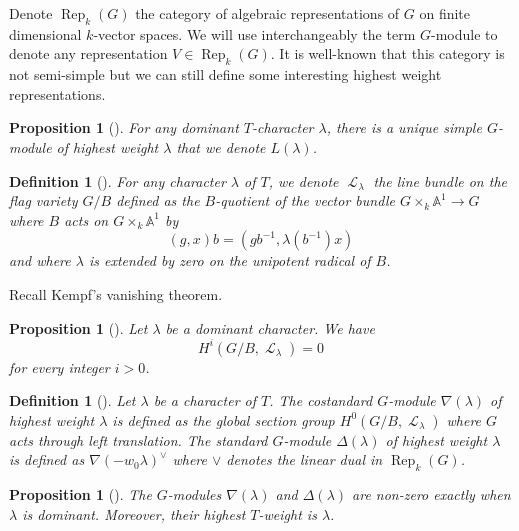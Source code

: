 \documentclass[11pt]{amsart}
\numberwithin{subsection}{section}
\numberwithin{figure}{section}
\numberwithin{table}{section}
\theoremstyle{1}
\newtheorem{proposition}[theorem]{Proposition}
\newtheorem{definition}[theorem]{Definition}
\theoremstyle{2}
\DeclareMathOperator{\Rep}{Rep}
\DeclareMathOperator{\Lc}{\mathcal{L}}
\begin{document}
Denote $\Rep_k(G)$ the category of algebraic representations of $G$ on finite dimensional $k$-vector spaces. We will use interchangeably the term $G$-module to denote any representation $V \in \Rep_k(G)$. It is well-known that this category is not semi-simple but we can still define some interesting highest weight representations. 
\begin{proposition}[{\cite[Part II, sect. 2.4]{MR2015057}}]
For any dominant $T$-character $\lambda$, there is a unique simple $G$-module of highest weight $\lambda$ that we denote $L(\lambda)$. 
\end{proposition}
\begin{definition}[{\cite[Part I, sect. 5.8]{MR2015057}}]
For any character $\lambda$ of $T$, we denote $\Lc_{\lambda}$ the line bundle on the flag variety $G/B$ defined as the $B$-quotient of the vector bundle $G \times_k \mathbb{A}^1 \rightarrow G$ where $B$ acts on $G \times_k \mathbb{A}^1$ by
\begin{equation*}
(g,x)b = (gb^{-1},\lambda(b^{-1})x)
\end{equation*}
and where $\lambda$ is extended by zero on the unipotent radical of $B$.
\end{definition}
\vspace*{0.2cm}
Recall Kempf's vanishing theorem.
\begin{proposition}[{\cite[Part II, sect. 4.5]{MR2015057}}]\label{prop4}
Let $\lambda$ be a dominant character. We have
\begin{equation*}
H^i(G/B,\Lc_{\lambda}) = 0
\end{equation*}
for every integer $i >0$.
\end{proposition}
\vspace*{0.2cm}
\begin{definition}[{\cite[Part II, sect. 2]{MR2015057}}]
Let $\lambda$ be a character of $T$. The costandard $G$-module $\nabla(\lambda)$ of highest weight $\lambda$ is defined as the global section group $H^0(G/B,\Lc_\lambda)$ where $G$ acts through left translation. The standard $G$-module $\Delta(\lambda)$ of highest weight $\lambda$ is defined as $\nabla(-w_0\lambda)^{\vee}$ where $\vee$ denotes the linear dual in $\Rep_k(G)$.
\end{definition}
\begin{proposition}[{\cite[Part II, sect. 2.6]{MR2015057}}]
The $G$-modules $\nabla(\lambda)$ and $\Delta(\lambda)$ are non-zero exactly when $\lambda$ is dominant. Moreover, their highest $T$-weight is $\lambda$.
\end{proposition}
\end{document}

